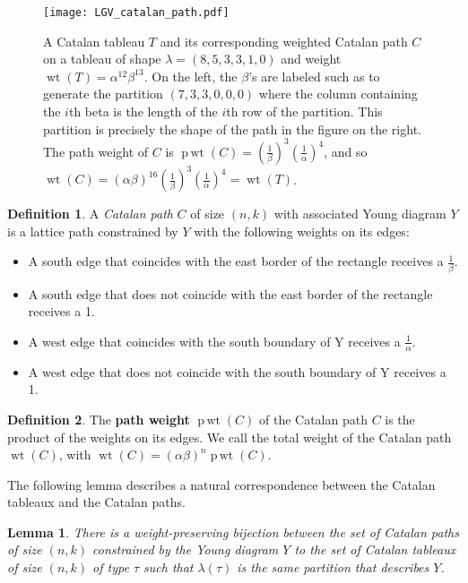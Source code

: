 \documentclass[11pt]{article}
\numberwithin{equation}{section}
\theoremstyle{plain}
\newtheorem{lemma}[thm]{Lemma}
\theoremstyle{definition}
\newtheorem{defn}{Definition}[section]
\theoremstyle{remark}
\DeclareMathOperator{\wt}{wt}
\DeclareMathOperator{\pwt}{p\,wt}
\begin{document}
\begin{figure}[h]
\centering
\texttt{[image: LGV\_catalan\_path.pdf]}
\caption{A Catalan tableau $T$ and its corresponding weighted Catalan path $C$ on a tableau of shape $\lambda=(8,5,3,3,1,0)$ and weight $\wt(T)=\alpha^{12}\beta^{13}$. On the left, the $\beta$'s are labeled such as to generate the partition $(7,3,3,0,0,0)$ where the column containing the $i$th beta is the length of the $i$th row of the partition. This partition is precisely the shape of the path in the figure on the right. The path weight of $C$ is $\pwt(C)=\left(\frac{1}{\beta}\right)^3\left(\frac{1}{\alpha}\right)^4$, and so $\wt(C) = (\alpha\beta)^{16}\left(\frac{1}{\beta}\right)^3\left(\frac{1}{\alpha}\right)^4 = \wt(T)$.}
\noindent
\label{cat_path}
\end{figure}

\begin{defn}
A \emph{Catalan path} $C$ of size $(n,k)$ with associated Young diagram $Y$ is a lattice path constrained by $Y$ with the following weights on its edges:
\begin{itemize}
\item A south edge that coincides with the east border of the rectangle receives a $\frac{1}{\beta}$.
\item A south edge that does not coincide with the east border of the rectangle receives a 1.
\item A west edge that coincides with the south boundary of Y receives a $\frac{1}{\alpha}$.
\item A west edge that does not coincide with the south boundary of Y receives a 1.
\end{itemize}
\end{defn}

\begin{defn}
The \textbf{path weight} $\pwt(C)$ of the Catalan path $C$ is the product of the weights on its edges. We call the total weight of the Catalan path $\wt(C)$, with $\wt(C)=(\alpha\beta)^n\pwt(C)$.
\end{defn}

The following lemma describes a natural correspondence between the Catalan tableaux and the Catalan paths.

\begin{lemma}
There is a weight-preserving bijection between the set of Catalan paths of size $(n,k)$ constrained by the Young diagram $Y$ to the set of Catalan tableaux of size $(n,k)$ of type $\tau$ such that $\lambda(\tau)$ is the same partition that describes $Y$.
\end{lemma}
\end{document}
